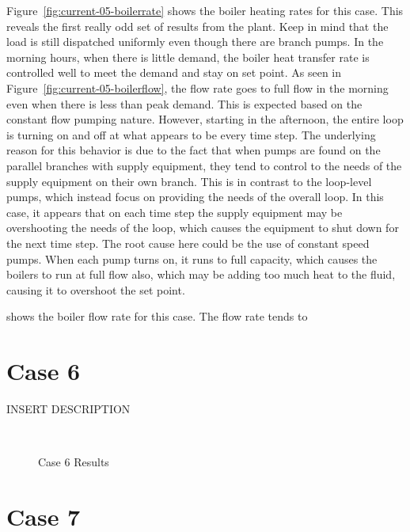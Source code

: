 \documentclass{report}
\begin{document}
    Figure~\ref{fig:current-05-boilerrate} shows the boiler heating rates for this case.
    This reveals the first really odd set of results from the plant.
    Keep in mind that the load is still dispatched uniformly even though there are branch pumps.
    In the morning hours, when there is little demand, the boiler heat transfer rate is controlled well to meet the demand and stay on set point.
    As seen in Figure~\ref{fig:current-05-boilerflow}, the flow rate goes to full flow in the morning even when there is less than peak demand.
    This is expected based on the constant flow pumping nature.
    However, starting in the afternoon, the entire loop is turning on and off at what appears to be every time step.
    The underlying reason for this behavior is due to the fact that when pumps are found on the parallel branches with supply equipment, they tend to control to the needs of the supply equipment on their own branch.
    This is in contrast to the loop-level pumps, which instead focus on providing the needs of the overall loop.
    In this case, it appears that on each time step the supply equipment may be overshooting the needs of the loop, which causes the equipment to shut down for the next time step.
    The root cause here could be the use of constant speed pumps.
    When each pump turns on, it runs to full capacity, which causes the boilers to run at full flow also, which may be adding too much heat to the fluid, causing it to overshoot the set point.

    shows the boiler flow rate for this case.
    The flow rate tends to

    \section{Case 6}\label{sec:current-06}

    INSERT DESCRIPTION

    \begin{figure*}[hbt]
        \centering
        ~
        \caption{Case 6 Results}
    \end{figure*}

    \section{Case 7}\label{sec:current-07}
\end{document}
